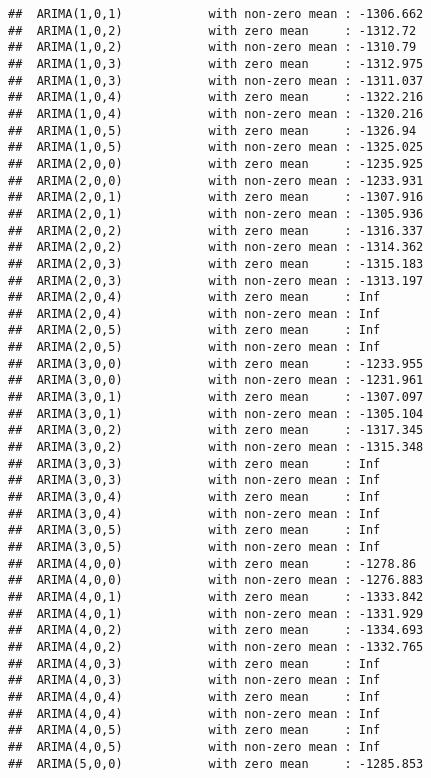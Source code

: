 \documentclass[]{article}
\begin{document}
\begin{verbatim}
##  ARIMA(1,0,1)            with non-zero mean : -1306.662
##  ARIMA(1,0,2)            with zero mean     : -1312.72
##  ARIMA(1,0,2)            with non-zero mean : -1310.79
##  ARIMA(1,0,3)            with zero mean     : -1312.975
##  ARIMA(1,0,3)            with non-zero mean : -1311.037
##  ARIMA(1,0,4)            with zero mean     : -1322.216
##  ARIMA(1,0,4)            with non-zero mean : -1320.216
##  ARIMA(1,0,5)            with zero mean     : -1326.94
##  ARIMA(1,0,5)            with non-zero mean : -1325.025
##  ARIMA(2,0,0)            with zero mean     : -1235.925
##  ARIMA(2,0,0)            with non-zero mean : -1233.931
##  ARIMA(2,0,1)            with zero mean     : -1307.916
##  ARIMA(2,0,1)            with non-zero mean : -1305.936
##  ARIMA(2,0,2)            with zero mean     : -1316.337
##  ARIMA(2,0,2)            with non-zero mean : -1314.362
##  ARIMA(2,0,3)            with zero mean     : -1315.183
##  ARIMA(2,0,3)            with non-zero mean : -1313.197
##  ARIMA(2,0,4)            with zero mean     : Inf
##  ARIMA(2,0,4)            with non-zero mean : Inf
##  ARIMA(2,0,5)            with zero mean     : Inf
##  ARIMA(2,0,5)            with non-zero mean : Inf
##  ARIMA(3,0,0)            with zero mean     : -1233.955
##  ARIMA(3,0,0)            with non-zero mean : -1231.961
##  ARIMA(3,0,1)            with zero mean     : -1307.097
##  ARIMA(3,0,1)            with non-zero mean : -1305.104
##  ARIMA(3,0,2)            with zero mean     : -1317.345
##  ARIMA(3,0,2)            with non-zero mean : -1315.348
##  ARIMA(3,0,3)            with zero mean     : Inf
##  ARIMA(3,0,3)            with non-zero mean : Inf
##  ARIMA(3,0,4)            with zero mean     : Inf
##  ARIMA(3,0,4)            with non-zero mean : Inf
##  ARIMA(3,0,5)            with zero mean     : Inf
##  ARIMA(3,0,5)            with non-zero mean : Inf
##  ARIMA(4,0,0)            with zero mean     : -1278.86
##  ARIMA(4,0,0)            with non-zero mean : -1276.883
##  ARIMA(4,0,1)            with zero mean     : -1333.842
##  ARIMA(4,0,1)            with non-zero mean : -1331.929
##  ARIMA(4,0,2)            with zero mean     : -1334.693
##  ARIMA(4,0,2)            with non-zero mean : -1332.765
##  ARIMA(4,0,3)            with zero mean     : Inf
##  ARIMA(4,0,3)            with non-zero mean : Inf
##  ARIMA(4,0,4)            with zero mean     : Inf
##  ARIMA(4,0,4)            with non-zero mean : Inf
##  ARIMA(4,0,5)            with zero mean     : Inf
##  ARIMA(4,0,5)            with non-zero mean : Inf
##  ARIMA(5,0,0)            with zero mean     : -1285.853

\end{verbatim}
\end{document}
